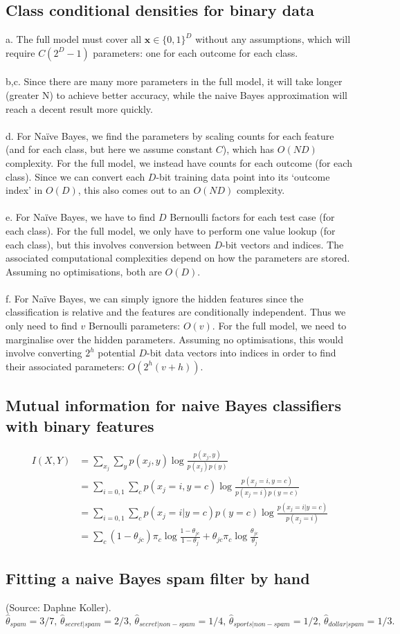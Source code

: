 \documentclass{article}
\begin{document}
\subsection{Class conditional densities for binary data}
a. The full model must cover all $\mathbf{x} \in \{0,1\}^D$ without any assumptions, which will require $C(2^D-1)$ parameters: one for each outcome for each class.\\\\
b,c. Since there are many more parameters in the full model, it will take longer (greater N) to achieve better accuracy, while the naive Bayes approximation will reach a decent result more quickly.\\\\
d. For Na\"ive Bayes, we find the parameters by scaling counts for each feature (and for each class, but here we assume constant $C$), which has $O(ND)$ complexity. For the full model, we instead have counts for each outcome (for each class). Since we can convert each $D$-bit training data point into its `outcome index' in $O(D)$, this also comes out to an $O(ND)$ complexity.\\\\
e. For Na\"ive Bayes, we have to find $D$ Bernoulli factors for each test case (for each class). For the full model, we only have to perform one value lookup (for each class), but this involves conversion between $D$-bit vectors and indices. The associated computational complexities depend on how the parameters are stored. Assuming no optimisations, both are $O(D)$.\\\\
f. For Na\"ive Bayes, we can simply ignore the hidden features since the classification is relative and the features are conditionally independent. Thus we only need to find $v$ Bernoulli parameters: $O(v)$. For the full model, we need to marginalise over the hidden parameters. Assuming no optimisations, this would involve converting $2^h$ potential $D$-bit data vectors into indices in order to find their associated parameters: $O(2^h(v+h))$.

\subsection{Mutual information for naive Bayes classifiers with binary features}
\begin{align*}
I(X,Y) &= \sum_{x_j} \sum_y p(x_j,y) \log\frac{p(x_j,y)}{p(x_j)p(y)}\\
&= \sum_{i=0,1} \sum_c p(x_j=i,y=c) \log\frac{p(x_j=i,y=c)}{p(x_j=i)p(y=c)}\\
&= \sum_{i=0,1} \sum_c p(x_j=i|y=c)p(y=c) \log\frac{p(x_j=i|y=c)}{p(x_j=i)}\\
&= \sum_c (1-\theta_{jc}) \pi_c \log\frac{1-\theta_{jc}}{1-\theta_j} + \theta_{jc} \pi_c \log\frac{\theta_{jc}}{\theta_j}
\end{align*}

\subsection{Fitting a naive Bayes spam filter by hand}
(Source: Daphne Koller). $\hat\theta_{spam} = 3/7,\, \hat\theta_{secret|spam} = 2/3,\, \hat\theta_{secret|non-spam} = 1/4,\, \hat\theta_{sports|non-spam} = 1/2,\, \hat\theta_{dollar|spam} = 1/3.$
\pagebreak

\end{document}
